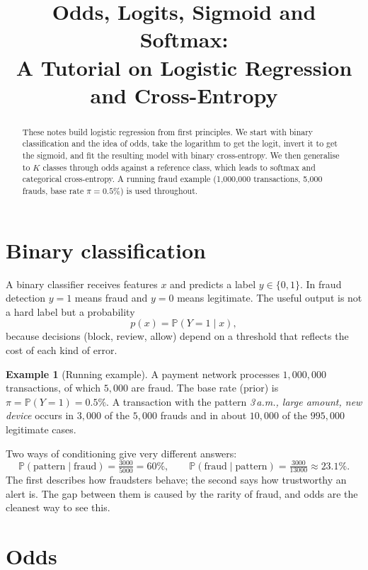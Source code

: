 \documentclass[11pt,a4paper]{article}
\title{Odds, Logits, Sigmoid and Softmax:\\
A Tutorial on Logistic Regression and Cross-Entropy}
\author{}
\date{}
\newcommand{\Prob}{\mathbb{P}}
\theoremstyle{definition}
\newtheorem{example}{Example}
\begin{document}
\maketitle

\begin{abstract}
\noindent These notes build logistic regression from first principles. We start with binary classification and the idea of odds, take the logarithm to get the logit, invert it to get the sigmoid, and fit the resulting model with binary cross-entropy. We then generalise to $K$ classes through odds against a reference class, which leads to softmax and categorical cross-entropy. A running fraud example (1{,}000{,}000 transactions, 5{,}000 frauds, base rate $\pi=0.5\%$) is used throughout.
\end{abstract}

\section{Binary classification}

A binary classifier receives features $x$ and predicts a label $y\in\{0,1\}$. In fraud detection $y=1$ means fraud and $y=0$ means legitimate. The useful output is not a hard label but a probability
\[
p(x) = \Prob(Y=1\mid x),
\]
because decisions (block, review, allow) depend on a threshold that reflects the cost of each kind of error.

\begin{example}[Running example]\label{ex:run}
A payment network processes $1{,}000{,}000$ transactions, of which $5{,}000$ are fraud. The base rate (prior) is $\pi=\Prob(Y=1)=0.5\%$. A transaction with the pattern \emph{3\,a.m., large amount, new device} occurs in $3{,}000$ of the $5{,}000$ frauds and in about $10{,}000$ of the $995{,}000$ legitimate cases.
\end{example}

Two ways of conditioning give very different answers:
\[
\Prob(\text{pattern}\mid\text{fraud})=\tfrac{3000}{5000}=60\%,
\qquad
\Prob(\text{fraud}\mid\text{pattern})=\tfrac{3000}{13000}\approx 23.1\%.
\]
The first describes how fraudsters behave; the second says how trustworthy an alert is. The gap between them is caused by the rarity of fraud, and odds are the cleanest way to see this.

\section{Odds}
\end{document}
